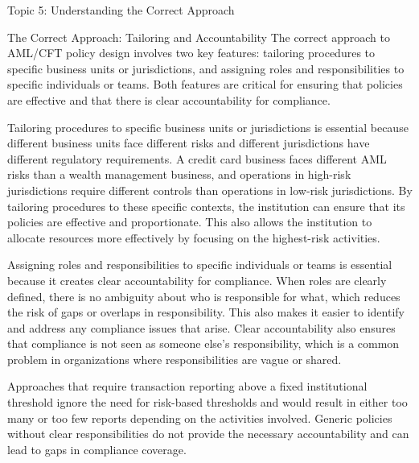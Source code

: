 \documentclass[5pt]{beamer}
\begin{document}
	\begin{frame}{Topic 5: Understanding the Correct Approach}
		\begin{block}{\tiny The Correct Approach: Tailoring and Accountability}
			\tiny The correct approach to AML/CFT policy design involves two key features: tailoring procedures to specific business units or jurisdictions, and assigning roles and responsibilities to specific individuals or teams. Both features are critical for ensuring that policies are effective and that there is clear accountability for compliance.
			
			Tailoring procedures to specific business units or jurisdictions is essential because different business units face different risks and different jurisdictions have different regulatory requirements. A credit card business faces different AML risks than a wealth management business, and operations in high-risk jurisdictions require different controls than operations in low-risk jurisdictions. By tailoring procedures to these specific contexts, the institution can ensure that its policies are effective and proportionate. This also allows the institution to allocate resources more effectively by focusing on the highest-risk activities.
			
			Assigning roles and responsibilities to specific individuals or teams is essential because it creates clear accountability for compliance. When roles are clearly defined, there is no ambiguity about who is responsible for what, which reduces the risk of gaps or overlaps in responsibility. This also makes it easier to identify and address any compliance issues that arise. Clear accountability also ensures that compliance is not seen as someone else's responsibility, which is a common problem in organizations where responsibilities are vague or shared.
			
			Approaches that require transaction reporting above a fixed institutional threshold ignore the need for risk-based thresholds and would result in either too many or too few reports depending on the activities involved. Generic policies without clear responsibilities do not provide the necessary accountability and can lead to gaps in compliance coverage.
		\end{block}
	\end{frame}
	
\end{document}
